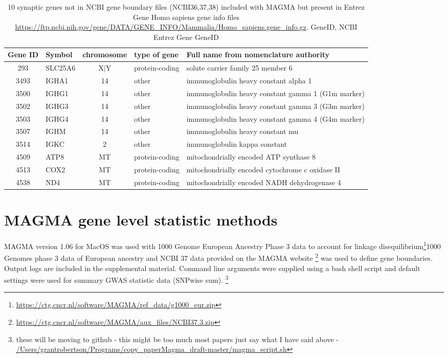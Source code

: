 \begin{table}[ht]
\centering
\begin{adjustbox}{max width=\textwidth}
\begin{tabular}{clcll}
  \hline
 Gene ID & Symbol & chromosome & type of gene & Full name from nomenclature authority \\ 
  \hline
293 & SLC25A6 & X$|$Y & protein-coding & solute carrier family 25 member 6 \\ 
  3493 & IGHA1 & 14 & other & immunoglobulin heavy constant alpha 1 \\ 
  3500 & IGHG1 & 14 & other & immunoglobulin heavy constant gamma 1 (G1m marker) \\ 
  3502 & IGHG3 & 14 & other & immunoglobulin heavy constant gamma 3 (G3m marker) \\ 
  3503 & IGHG4 & 14 & other & immunoglobulin heavy constant gamma 4 (G4m marker) \\ 
  3507 & IGHM & 14 & other & immunoglobulin heavy constant mu \\ 
  3514 & IGKC & 2 & other & immunoglobulin kappa constant \\ 
  4509 & ATP8 & MT & protein-coding & mitochondrially encoded ATP synthase 8 \\ 
  4513 & COX2 & MT & protein-coding & mitochondrially encoded cytochrome c oxidase II \\ 
  4538 & ND4 & MT & protein-coding & mitochondrially encoded NADH dehydrogenase 4 \\ 
   \hline
\end{tabular}
\end{adjustbox}
\caption[Synaptic genes not in NCBI boundary files in MAGMA]{10 synaptic genes not in NCBI gene boundary files (NCBI36,37,38) included with MAGMA but present in Entrez Gene Homo sapiens gene info files \url{https://ftp.ncbi.nih.gov/gene/DATA/GENE_INFO/Mammalia/Homo_sapiens.gene_info.gz}.  GeneID, NCBI Entrez Gene GeneID }
\label{tab:10 synaptic genes not in NCBI 38 included with MAGMA but present in entrez gene gene info}
\end{table}

\section{MAGMA gene level statistic methods}
\label{sec:MAGMA gene level methods}
MAGMA version 1.06 for MacOS was used with 1000 Genome European Ancestry Phase 3 data to account for linkage disequilibrium\footnote{\url{https://ctg.cncr.nl/software/MAGMA/ref_data/g1000_eur.zip}}1000 Genomes phase 3 data of European ancestry and NCBI 37 data provided on the MAGMA website \footnote{\url{https://ctg.cncr.nl/software/MAGMA/aux_files/NCBI37.3.zip}} was used to define gene boundaries. Output logs are included in the supplemental material.  Command line arguments were supplied using a bash shell script and default settings were used for summary GWAS statistic data (SNPwise sum). \footnote{these will be moving to github - this might be too much most papers just say what I have said above -  \url{/Users/grantrobertson/Programs/copy_paperMagma_draft-master/magma_script.sh}	}

